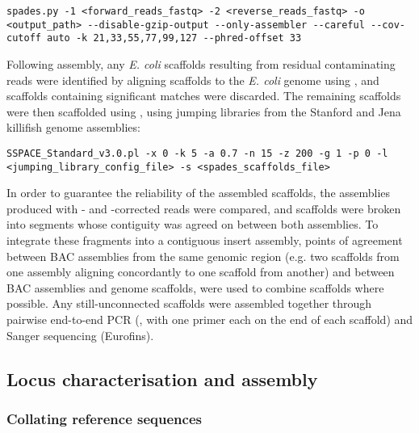 \begin{lstlisting}
spades.py -1 <forward_reads_fastq> -2 <reverse_reads_fastq> -o <output_path> --disable-gzip-output --only-assembler --careful --cov-cutoff auto -k 21,33,55,77,99,127 --phred-offset 33
\end{lstlisting}

Following assembly, any \textit{E. coli} scaffolds resulting from residual contaminating reads were identified by aligning scaffolds to the \textit{E. coli} genome using  \parencite{altschul1990blast,altschul1997blast}, and scaffolds containing significant matches were discarded. The remaining scaffolds were then scaffolded using  \parencite{boetzer2011sspace}, using jumping libraries from the Stanford and Jena killifish genome assemblies: %

\begin{lstlisting}
SSPACE_Standard_v3.0.pl -x 0 -k 5 -a 0.7 -n 15 -z 200 -g 1 -p 0 -l <jumping_library_config_file> -s <spades_scaffolds_file>
\end{lstlisting}

In order to guarantee the reliability of the assembled scaffolds, the assemblies produced with - and -corrected reads were compared, and scaffolds were broken into segments whose contiguity was agreed on between both assemblies. To integrate these fragments into a contiguous insert assembly, points of agreement between BAC assemblies from the same genomic region (e.g. two scaffolds from one assembly aligning concordantly to one scaffold from another) and between BAC assemblies and genome scaffolds, were used to combine scaffolds where possible. Any still-unconnected scaffolds were assembled together through pairwise end-to-end PCR (, with one primer each on the end of each scaffold) and Sanger sequencing (Eurofins).

\subsection{Locus characterisation and assembly}
\label{sec:methods_comp_locus}

\subsubsection{Collating reference sequences}
\label{sec:methods_comp_locus_reference}

